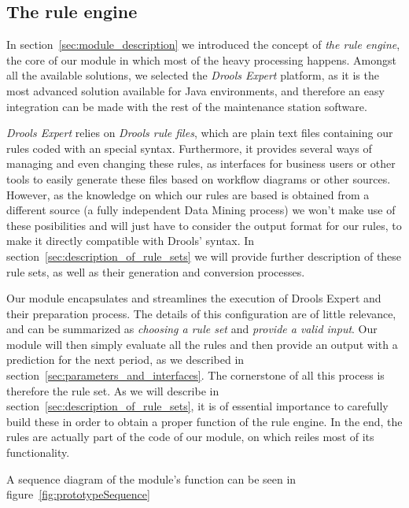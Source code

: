\documentclass[a4paper,12pt]{article}
\begin{document}
\subsection{The rule engine}
In section~\ref{sec:module_description} we introduced the concept of \emph{the rule engine}, the core of our module in which most of the heavy processing happens. Amongst all the available solutions, we selected the \emph{Drools Expert}\cite{browne2009jboss} platform, as it is the most advanced solution available for Java environments, and therefore an easy integration can be made with the rest of the maintenance station software.

\emph{Drools Expert} relies on \emph{Drools rule files}, which are plain text files containing our rules coded with an special syntax. Furthermore, it provides several ways of managing and even changing these rules, as interfaces for business users or other tools to easily generate these files based on workflow diagrams or other sources. However, as the knowledge on which our rules are based is obtained from a different source (a fully independent Data Mining process) we won't make use of these posibilities and will just have to consider the output format for our rules, to make it directly compatible with Drools' syntax. In section~\ref{sec:description_of_rule_sets} we will provide further description of these rule sets, as well as their generation and conversion processes.

Our module encapsulates and streamlines the execution of Drools Expert and their preparation process. The details of this configuration are of little relevance, and can be summarized as \emph{choosing a rule set} and \emph{provide a valid input}. Our module will then simply evaluate all the rules and then provide an output with a prediction for the next period, as we described in section~\ref{sec:parameters_and_interfaces}. The cornerstone of all this process is therefore the rule set. As we will describe in section~\ref{sec:description_of_rule_sets}, it is of essential importance to carefully build these in order to obtain a proper function of the rule engine. In the end, the rules are actually part of the code of our module, on which reiles most of its functionality.

A sequence diagram of the module's function can be seen in figure~\ref{fig:prototypeSequence}
\end{document}
